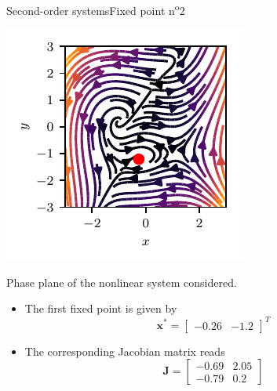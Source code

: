 \documentclass[usenames,dvipsnames,svgnames,10pt,aspectratio=169]{beamer}
\begin{document}
\begin{frame}[t, c]{Second-order systems}{Fixed point n\textsuperscript{o}2}
		\begin{minipage}{.48\textwidth}
			\centering
			\includegraphics[width=.75\textwidth]{fixed_points_2}

			{\small Phase plane of the nonlinear system considered.}
		\end{minipage}%
		\hfill
		\begin{minipage}{.48\textwidth}
			\begin{itemize}
				\item The first fixed point is given by
				$${\bm x}^* = \begin{bmatrix} -0.26 & -1.2 \end{bmatrix}^T$$

				\bigskip

				\item The corresponding Jacobian matrix reads
				$${\bm J} = \begin{bmatrix} -0.69 & 2.05 \\ -0.79 & 0.2 \end{bmatrix}$$
			\end{itemize}
		\end{minipage}

		\vspace{1cm}
\end{frame}
\end{document}
